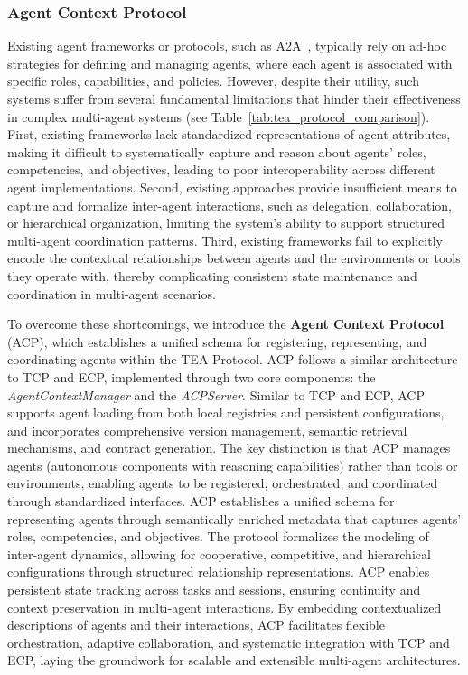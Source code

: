 \documentclass[11pt]{article}
\begin{document}
\subsubsection{Agent Context Protocol}

Existing agent frameworks or protocols, such as A2A~\citep{google2024a2a}, typically rely on ad-hoc strategies for defining and managing agents, where each agent is associated with specific roles, capabilities, and policies. However, despite their utility, such systems suffer from several fundamental limitations that hinder their effectiveness in complex multi-agent systems (see Table~\ref{tab:tea_protocol_comparison}). First, existing frameworks lack standardized representations of agent attributes, making it difficult to systematically capture and reason about agents' roles, competencies, and objectives, leading to poor interoperability across different agent implementations. Second, existing approaches provide insufficient means to capture and formalize inter-agent interactions, such as delegation, collaboration, or hierarchical organization, limiting the system's ability to support structured multi-agent coordination patterns. Third, existing frameworks fail to explicitly encode the contextual relationships between agents and the environments or tools they operate with, thereby complicating consistent state maintenance and coordination in multi-agent scenarios.

To overcome these shortcomings, we introduce the \textbf{Agent Context Protocol} (ACP), which establishes a unified schema for registering, representing, and coordinating agents within the TEA Protocol. ACP follows a similar architecture to TCP and ECP, implemented through two core components: the \textit{AgentContextManager} and the \textit{ACPServer}. Similar to TCP and ECP, ACP supports agent loading from both local registries and persistent configurations, and incorporates comprehensive version management, semantic retrieval mechanisms, and contract generation. The key distinction is that ACP manages agents (autonomous components with reasoning capabilities) rather than tools or environments, enabling agents to be registered, orchestrated, and coordinated through standardized interfaces. ACP establishes a unified schema for representing agents through semantically enriched metadata that captures agents' roles, competencies, and objectives. The protocol formalizes the modeling of inter-agent dynamics, allowing for cooperative, competitive, and hierarchical configurations through structured relationship representations. ACP enables persistent state tracking across tasks and sessions, ensuring continuity and context preservation in multi-agent interactions. By embedding contextualized descriptions of agents and their interactions, ACP facilitates flexible orchestration, adaptive collaboration, and systematic integration with TCP and ECP, laying the groundwork for scalable and extensible multi-agent architectures.
\end{document}
